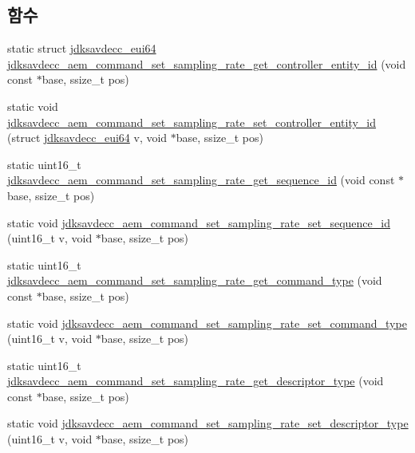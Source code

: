 \subsection*{함수}
\begin{DoxyCompactItemize}
\item 
static struct \hyperlink{structjdksavdecc__eui64}{jdksavdecc\+\_\+eui64} \hyperlink{group__command__set__sampling__rate_ga76bd97aa7bf9d954b31bcc421d73cf5f}{jdksavdecc\+\_\+aem\+\_\+command\+\_\+set\+\_\+sampling\+\_\+rate\+\_\+get\+\_\+controller\+\_\+entity\+\_\+id} (void const $\ast$base, ssize\+\_\+t pos)
\item 
static void \hyperlink{group__command__set__sampling__rate_gab967b8308d50d1af131dbf3161f945b5}{jdksavdecc\+\_\+aem\+\_\+command\+\_\+set\+\_\+sampling\+\_\+rate\+\_\+set\+\_\+controller\+\_\+entity\+\_\+id} (struct \hyperlink{structjdksavdecc__eui64}{jdksavdecc\+\_\+eui64} v, void $\ast$base, ssize\+\_\+t pos)
\item 
static uint16\+\_\+t \hyperlink{group__command__set__sampling__rate_gab55e509620b9807c140a9ee77bb69e1e}{jdksavdecc\+\_\+aem\+\_\+command\+\_\+set\+\_\+sampling\+\_\+rate\+\_\+get\+\_\+sequence\+\_\+id} (void const $\ast$base, ssize\+\_\+t pos)
\item 
static void \hyperlink{group__command__set__sampling__rate_ga3a90c42b8a6e215db7ced100b302b502}{jdksavdecc\+\_\+aem\+\_\+command\+\_\+set\+\_\+sampling\+\_\+rate\+\_\+set\+\_\+sequence\+\_\+id} (uint16\+\_\+t v, void $\ast$base, ssize\+\_\+t pos)
\item 
static uint16\+\_\+t \hyperlink{group__command__set__sampling__rate_ga3489502549a89ac3e2d34e936fb9df2d}{jdksavdecc\+\_\+aem\+\_\+command\+\_\+set\+\_\+sampling\+\_\+rate\+\_\+get\+\_\+command\+\_\+type} (void const $\ast$base, ssize\+\_\+t pos)
\item 
static void \hyperlink{group__command__set__sampling__rate_ga0f09fed3f9fdd101927e399f6118038a}{jdksavdecc\+\_\+aem\+\_\+command\+\_\+set\+\_\+sampling\+\_\+rate\+\_\+set\+\_\+command\+\_\+type} (uint16\+\_\+t v, void $\ast$base, ssize\+\_\+t pos)
\item 
static uint16\+\_\+t \hyperlink{group__command__set__sampling__rate_ga70f52702768e7e48c4c2ef2434e41ff2}{jdksavdecc\+\_\+aem\+\_\+command\+\_\+set\+\_\+sampling\+\_\+rate\+\_\+get\+\_\+descriptor\+\_\+type} (void const $\ast$base, ssize\+\_\+t pos)
\item 
static void \hyperlink{group__command__set__sampling__rate_ga7aaff729a629c4f982c24f990f52591b}{jdksavdecc\+\_\+aem\+\_\+command\+\_\+set\+\_\+sampling\+\_\+rate\+\_\+set\+\_\+descriptor\+\_\+type} (uint16\+\_\+t v, void $\ast$base, ssize\+\_\+t pos)

\end{DoxyCompactItemize}
